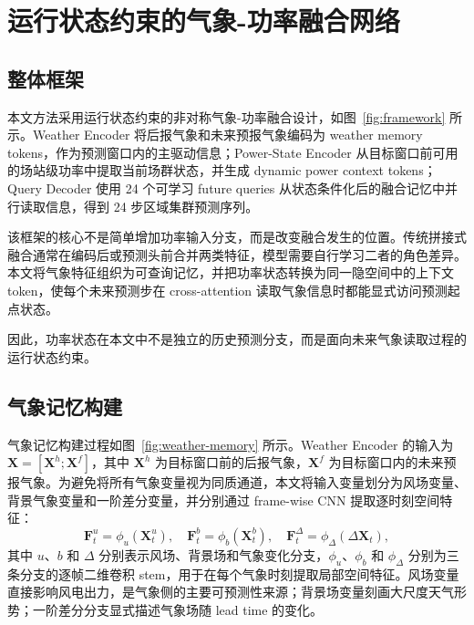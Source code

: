 \section{运行状态约束的气象-功率融合网络}

\subsection{整体框架}

本文方法采用运行状态约束的非对称气象-功率融合设计，如图~\ref{fig:framework} 所示。Weather Encoder 将后报气象和未来预报气象编码为 weather memory tokens，作为预测窗口内的主驱动信息；Power-State Encoder 从目标窗口前可用的场站级功率中提取当前场群状态，并生成 dynamic power context tokens；Query Decoder 使用 24 个可学习 future queries 从状态条件化后的融合记忆中并行读取信息，得到 24 步区域集群预测序列。

该框架的核心不是简单增加功率输入分支，而是改变融合发生的位置。传统拼接式融合通常在编码后或预测头前合并两类特征，模型需要自行学习二者的角色差异。本文将气象特征组织为可查询记忆，并把功率状态转换为同一隐空间中的上下文 token，使每个未来预测步在 cross-attention 读取气象信息时都能显式访问预测起点状态。

因此，功率状态在本文中不是独立的历史预测分支，而是面向未来气象读取过程的运行状态约束。

\subsection{气象记忆构建}

气象记忆构建过程如图~\ref{fig:weather-memory} 所示。Weather Encoder 的输入为 \(\mathbf{X}=[\mathbf{X}^{h};\mathbf{X}^{f}]\)，其中 \(\mathbf{X}^{h}\) 为目标窗口前的后报气象，\(\mathbf{X}^{f}\) 为目标窗口内的未来预报气象。为避免将所有气象变量视为同质通道，本文将输入变量划分为风场变量、背景气象变量和一阶差分变量，并分别通过 frame-wise CNN 提取逐时刻空间特征：
\begin{equation}
\mathbf{F}^{u}_{t}=\phi_{u}(\mathbf{X}^{u}_{t}),\quad
\mathbf{F}^{b}_{t}=\phi_{b}(\mathbf{X}^{b}_{t}),\quad
\mathbf{F}^{\Delta}_{t}=\phi_{\Delta}(\Delta\mathbf{X}_{t}),
\end{equation}
其中 \(u\)、\(b\) 和 \(\Delta\) 分别表示风场、背景场和气象变化分支，\(\phi_{u}\)、\(\phi_{b}\) 和 \(\phi_{\Delta}\) 分别为三条分支的逐帧二维卷积 stem，用于在每个气象时刻提取局部空间特征。风场变量直接影响风电出力，是气象侧的主要可预测性来源；背景场变量刻画大尺度天气形势；一阶差分分支显式描述气象场随 lead time 的变化。

